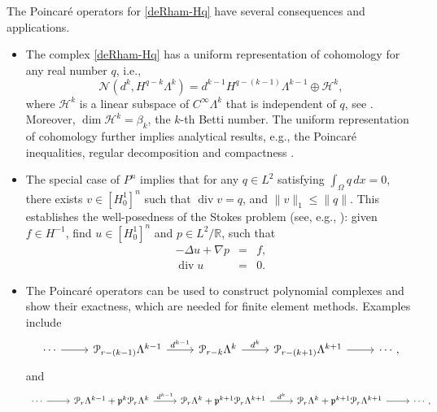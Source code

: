 \documentclass[11pt]{amsart}
\newcommand{\0}{\mathaccent23}
\renewcommand\div{\operatorname{div}}
\renewcommand\ker{\mathcal{N}}
\begin{document}

The Poincar\'e operators for \eqref{deRham-Hq} have several consequences and applications. 
\begin{itemize}
\item The complex \eqref{deRham-Hq} has a uniform representation of cohomology for any real number $q$, i.e., 
$$
\ker(d^{k}, H^{q-k}\Lambda^{k})=d^{k-1}H^{q-(k-1)}\Lambda^{k-1}\oplus \mathscr{H}^{k},
$$
where $\mathscr{H}^{k}$ is a linear subspace of $C^{\infty}\Lambda^{k}$ that is independent of $q$, see \cite{costabel2010bogovskiui}. Moreover, $\dim \mathscr{H}^{k}=\beta_{k}$, the $k$-th Betti number. The uniform representation of cohomology further implies analytical results, e.g., the Poincar\'e inequalities, regular decomposition and compactness \cite{arnold2021complexes}. 
\item The special case of $P^{n}$ implies that for any $q\in L^{2}$ satisfying $\int_{\Omega}q\,dx=0$, there exists $v\in [H_{0}^{1}]^{n}$ such that $\div v=q$, and $\|v\|_{1}\leq \|q\|$. This establishes the well-posedness of the Stokes problem (see, e.g., \cite{Girault.V;Raviart.P.1986a,temam1984navier}): given $f\in H^{-1}$, find $u\in [H_{0}^{1}]^{n}$ and $p\in L^{2}/\mathbb{R}$, such that
\begin{eqnarray*} 
-\Delta u+\nabla p &=& f,\\
\div u&=&0.
\end{eqnarray*}
\item The Poincar\'e operators can be used to construct polynomial complexes and show their exactness, which are needed for finite element methods. Examples include
\begin{equation}\label{polynomial-1}
\begin{tikzcd}
\cdots \arrow{r}& \mathcal{P}_{r-(k-1)}\Lambda^{k-1} \arrow{r}{d^{k-1}}& \mathcal{P}_{r-k}\Lambda^{k}  \arrow{r}{d^{k}}& \mathcal{P}_{r-(k+1)}\Lambda^{k+1}  \arrow{r}{}&\cdots, 
\end{tikzcd}
\end{equation}
and
\begin{equation}\label{polynomial-2}
\begin{tikzcd}
\cdots \arrow{r}& \mathcal{P}_{r }\Lambda^{k-1}+ \mathfrak{p}^{k}\mathcal{P}_{r }\Lambda^{k} \arrow{r}{d^{k-1}}& \mathcal{P}_{r }\Lambda^{k}+ \mathfrak{p}^{k+1}\mathcal{P}_{r }\Lambda^{k+1}\arrow{r}{d^{k}}& \mathcal{P}_{r }\Lambda^{k}+ \mathfrak{p}^{k+1}\mathcal{P}_{r }\Lambda^{k+1}  \arrow{r}{}&\cdots, 

\end{tikzcd}
\end{equation}
\end{itemize}
\end{document}
